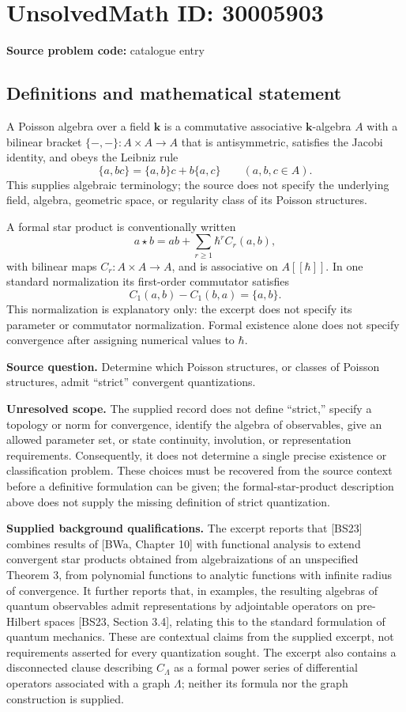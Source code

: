 \documentclass[11pt]{article}
\begin{document}
\section*{UnsolvedMath ID: 30005903}
\textbf{Source problem code:} catalogue entry
\subsection{Definitions and mathematical statement}
A Poisson algebra over a field \(\mathbf{k}\) is a commutative associative \(\mathbf{k}\)-algebra \(A\) with a bilinear bracket \(\{-,-\}:A\times A\to A\) that is antisymmetric, satisfies the Jacobi identity, and obeys the Leibniz rule
\[
\{a,bc\}=\{a,b\}c+b\{a,c\}\qquad(a,b,c\in A).
\]
This supplies algebraic terminology; the source does not specify the underlying field, algebra, geometric space, or regularity class of its Poisson structures.

A formal star product is conventionally written
\[
a\star b=ab+\sum_{r\geq 1}\hbar^r C_r(a,b),
\]
with bilinear maps \(C_r:A\times A\to A\), and is associative on \(A[[\hbar]]\). In one standard normalization its first-order commutator satisfies
\[
C_1(a,b)-C_1(b,a)=\{a,b\}.
\]
This normalization is explanatory only: the excerpt does not specify its parameter or commutator normalization. Formal existence alone does not specify convergence after assigning numerical values to \(\hbar\).

\textbf{Source question.} Determine which Poisson structures, or classes of Poisson structures, admit ``strict'' convergent quantizations.

\textbf{Unresolved scope.} The supplied record does not define ``strict,'' specify a topology or norm for convergence, identify the algebra of observables, give an allowed parameter set, or state continuity, involution, or representation requirements. Consequently, it does not determine a single precise existence or classification problem. These choices must be recovered from the source context before a definitive formulation can be given; the formal-star-product description above does not supply the missing definition of strict quantization.

\textbf{Supplied background qualifications.} The excerpt reports that [BS23] combines results of [BWa, Chapter 10] with functional analysis to extend convergent star products obtained from algebraizations of an unspecified Theorem 3, from polynomial functions to analytic functions with infinite radius of convergence. It further reports that, in examples, the resulting algebras of quantum observables admit representations by adjointable operators on pre-Hilbert spaces [BS23, Section 3.4], relating this to the standard formulation of quantum mechanics. These are contextual claims from the supplied excerpt, not requirements asserted for every quantization sought. The excerpt also contains a disconnected clause describing \(C_{\Lambda}\) as a formal power series of differential operators associated with a graph \(\Lambda\); neither its formula nor the graph construction is supplied.
\end{document}
